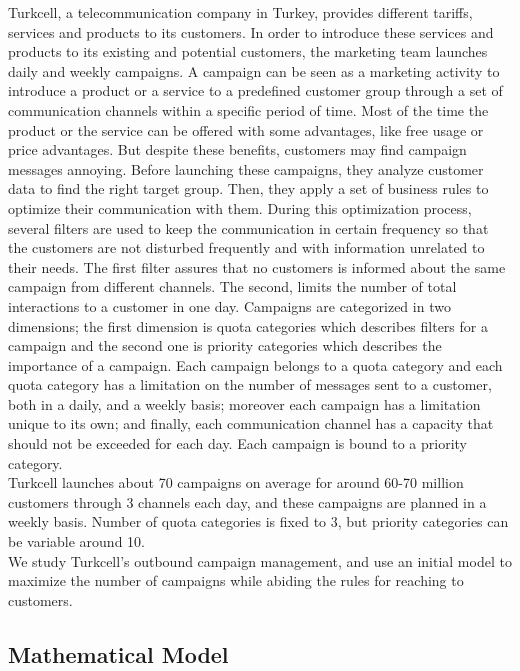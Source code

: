 \documentclass[11pt]{article}
\begin{document}
Turkcell, a telecommunication company in Turkey, provides different tariffs, services and products to its customers. In order to introduce these services and products to its existing and potential customers, the marketing team launches daily and weekly campaigns. A campaign can be seen as a marketing activity to introduce a product or a service to a predefined customer group through a set of communication channels within a specific period of time. Most of the time the product or the service can be offered with some advantages, like free usage or price advantages. But despite these benefits, customers may find campaign messages annoying. Before launching these campaigns, they analyze customer data to find the right target group. Then, they apply a set of business rules to optimize their communication with them. During this optimization process, several filters are used to keep the communication in certain frequency so that the customers are not disturbed frequently and with information unrelated to their needs. The first filter assures that no customers is informed about the same campaign from different channels. The second, limits the number of total interactions to a customer in one day. Campaigns are categorized in two dimensions; the first dimension is quota categories which describes filters for a campaign and the second one is priority categories which describes the importance of a campaign. Each campaign belongs to a quota category and each quota category has a limitation on the number of messages sent to a customer, both in a daily, and a weekly basis; moreover each campaign has a limitation unique to its own; and finally, each communication channel has a capacity that should not be exceeded for each day. Each campaign is bound to a priority category.\\

Turkcell launches about 70 campaigns on average for around 60-70 million customers through 3 channels each day, and these campaigns are planned in a weekly basis. Number of quota categories is fixed to 3, but priority categories can be variable around 10.\\

We study Turkcell’s outbound campaign management, and use an initial model to maximize the number of campaigns while abiding the rules for reaching to customers.

\subsection{Mathematical Model} \label{s:problem-math}
\end{document}
